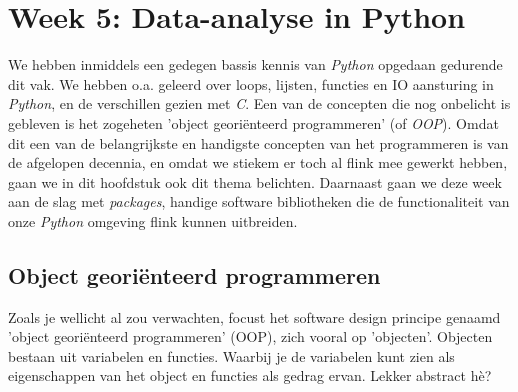 \chapter{Week 5: Data-analyse in Python}

We hebben inmiddels een gedegen bassis kennis van \textit{Python} opgedaan gedurende dit vak. We hebben o.a. geleerd over loops, lijsten, functies en IO aansturing in \textit{Python}, en de verschillen gezien met \textit{C}. Een van de concepten die nog onbelicht is gebleven is het zogeheten 'object georiënteerd programmeren' (of \textit{OOP}).
Omdat dit een van de belangrijkste en handigste concepten van het programmeren is van de afgelopen decennia, en omdat we stiekem er toch al flink mee gewerkt hebben, gaan we in dit hoofdstuk ook dit thema belichten. Daarnaast gaan we deze week aan de slag met \textit{packages}, handige software bibliotheken die de functionaliteit van onze \textit{Python} omgeving flink kunnen uitbreiden. 

\section{Object georiënteerd programmeren}
Zoals je wellicht al zou verwachten, focust het software design principe genaamd 'object georiënteerd programmeren' (OOP), zich vooral op 'objecten'. Objecten bestaan uit variabelen en functies. Waarbij je de variabelen kunt zien als eigenschappen van het object en functies als gedrag ervan. Lekker abstract hè? 

